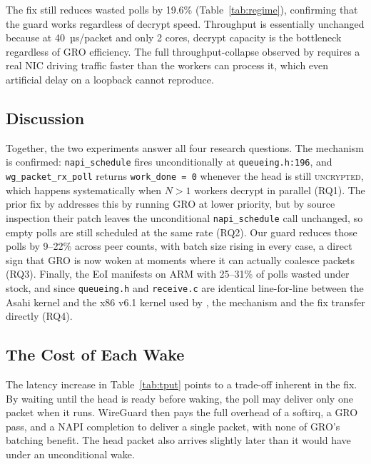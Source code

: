 \documentclass{article}
\begin{document}
The fix still reduces wasted polls by 19.6\% (Table~\ref{tab:regime}),
confirming that the guard works regardless of decrypt speed. Throughput is
essentially unchanged because at 40~µs/packet and only 2 cores, decrypt
capacity is the bottleneck regardless of GRO efficiency. The full
throughput-collapse observed by \citeauthor{mounah2025} requires a real NIC
driving traffic faster than the workers can process it, which even artificial
delay on a loopback cannot reproduce.

\subsection{Discussion}

Together, the two experiments answer all four research questions. The mechanism
is confirmed: \texttt{napi\_schedule} fires unconditionally at
\texttt{queueing.h:196}, and \texttt{wg\_packet\_rx\_poll} returns
\texttt{work\_done = 0} whenever the head is still \textsc{uncrypted}, which
happens systematically when $N > 1$ workers decrypt in parallel (RQ1). The prior fix
by \citeauthor{mounah2025} addresses this by running GRO at lower priority, but
by source inspection their patch leaves the unconditional \texttt{napi\_schedule}
call unchanged, so empty polls are still scheduled at the same rate (RQ2). Our
guard reduces those polls by 9--22\% across peer counts, with batch size rising
in every case, a direct sign that GRO is now woken at moments where it can
actually coalesce packets (RQ3). Finally, the EoI manifests on ARM with 25--31\%
of polls wasted under stock, and since \texttt{queueing.h} and \texttt{receive.c}
are identical line-for-line between the Asahi kernel and the x86 v6.1 kernel
used by \citeauthor{mounah2025}, the mechanism and the fix transfer directly
(RQ4).

\subsection{The Cost of Each Wake}
\label{subsec:costwake}

The latency increase in Table~\ref{tab:tput} points to a trade-off inherent in
the fix. By waiting until the head is ready before waking, the poll may deliver
only one packet when it runs. WireGuard then pays the full overhead of a
softirq, a GRO pass, and a NAPI completion to deliver a single packet, with
none of GRO's batching benefit. The head packet also arrives slightly later
than it would have under an unconditional wake.
\end{document}
